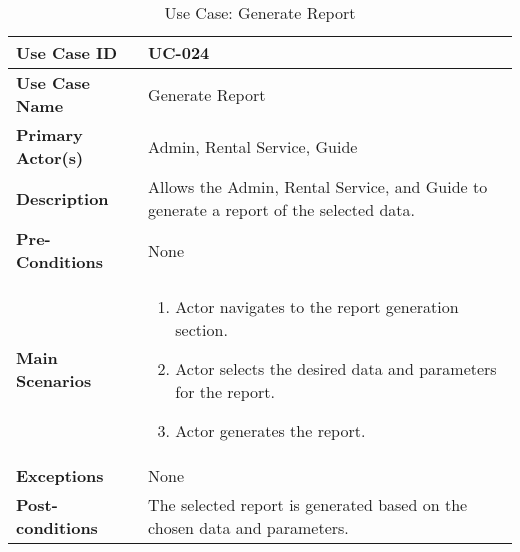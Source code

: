 \begin{table}[ht]
    \centering
    \begin{tabular}{|l|p{}|}
        \hline
        \textbf{Use Case ID} & UC-024 \\
        \hline
        \textbf{Use Case Name} & Generate Report \\
        \hline
        \textbf{Primary Actor(s)} & Admin, Rental Service, Guide \\
        \hline
        \textbf{Description} & Allows the Admin, Rental Service, and Guide to generate a report of the selected data. \\
        \hline
        \textbf{Pre-Conditions} & None \\
        \hline
        \textbf{Main Scenarios} & 
        \begin{enumerate}[label=\arabic*.,itemsep=0pt]
            \item Actor navigates to the report generation section.
            \item Actor selects the desired data and parameters for the report.
            \item Actor generates the report.
        \end{enumerate} \\
        \hline
        \textbf{Exceptions} & None \\
        \hline
        \textbf{Post-conditions} & The selected report is generated based on the chosen data and parameters. \\
        \hline
    \end{tabular}
    \label{tab:use-case-generate-report}
    \caption{Use Case: Generate Report}
\end{table}

